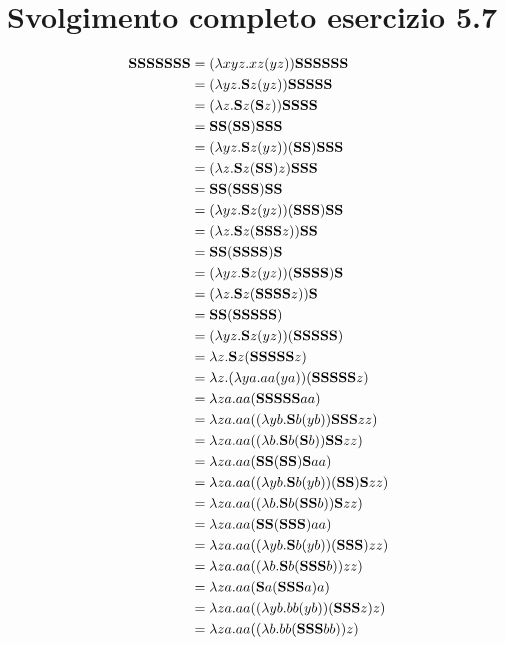 \chapter{Svolgimento completo esercizio 5.7}

	\begin{align*}
		\textbf{SSSSSSS} & = (\lambda xyz.xz(yz))\textbf{SSSSSS}\\
		& = (\lambda yz.\textbf{S} z(yz))\textbf{SSSSS}\\
		& = (\lambda z.\textbf{S} z(\textbf{S} z))\textbf{SSSS}\\
		& = \textbf{SS}(\textbf{SS})\textbf{SSS}\\
		& = (\lambda yz.\textbf{S} z(yz))(\textbf{SS})\textbf{SSS}\\
		& = (\lambda z.\textbf{S} z(\textbf{SS})z)\textbf{SSS}\\
		& = \textbf{SS}(\textbf{SSS})\textbf{SS}\\
		& = (\lambda yz.\textbf{S} z(yz))(\textbf{SSS})\textbf{SS}\\
		& = (\lambda z.\textbf{S} z(\textbf{SSS} z))\textbf{SS}\\
		& = \textbf{SS}(\textbf{SSSS})\textbf{S}\\
		& = (\lambda yz.\textbf{S} z(yz))(\textbf{SSSS})\textbf{S}\\
		& = (\lambda z.\textbf{S} z(\textbf{SSSS} z))\textbf{S}\\
		& = \textbf{SS}(\textbf{SSSSS})\\
		& = (\lambda yz.\textbf{S} z(yz))(\textbf{SSSSS})\\
		& = \lambda z.\textbf{S} z(\textbf{SSSSS} z)\\
		& = \lambda z.(\lambda ya.a a(y a))(\textbf{SSSSS} z)\\
		& = \lambda za.a a(\textbf{SSSSS} a a)\\
		& = \lambda za.a a((\lambda yb.\textbf{S} b(y b))\textbf{SSS} z z)\\
		& = \lambda za.a a ((\lambda b.\textbf{S} b (\textbf{S} b)) \textbf{SS} z z)\\
		& = \lambda za.a a (\textbf{SS} (\textbf{SS}) \textbf{S} a a)\\
		& = \lambda za.a a ((\lambda yb.\textbf{S} b (y b)) (\textbf{SS}) \textbf{S} z z)\\
		& = \lambda za.a a ((\lambda b.\textbf{S} b (\textbf{SS} b)) \textbf{S} z z)\\
		& = \lambda za.a a (\textbf{SS} (\textbf{SSS}) a a)\\
		& = \lambda za.a a ((\lambda yb.\textbf{S} b (y b)) (\textbf{SSS}) z z)\\
		& = \lambda za.a a ((\lambda b.\textbf{S} b (\textbf{SSS} b)) z z)\\
		& = \lambda za.a a (\textbf{S} a (\textbf{SSS} a) a)\\
		& = \lambda za.a a ((\lambda yb.b b (y b)) (\textbf{SSS} z) z)\\
		& = \lambda za.a a ((\lambda b.b b (\textbf{SSS} b b)) z)\\
	\end{align*}
